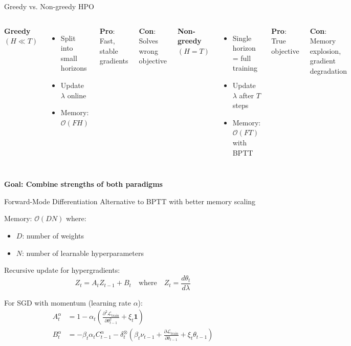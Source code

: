 \documentclass{beamer}
\begin{document}
\begin{frame}{Greedy vs. Non-greedy HPO}
\begin{columns}
\textbf{Greedy} \((H \ll T)\)
\begin{itemize}
    \item Split into small horizons
    \item Update \(\lambda\) online
    \item Memory: \(\mathcal{O}(FH)\)
\end{itemize}
\textbf{Pro}: Fast, stable gradients

\textbf{Con}: Solves wrong objective

\textbf{Non-greedy} \((H = T)\)
\begin{itemize}
    \item Single horizon = full training
    \item Update \(\lambda\) after \(T\) steps
    \item Memory: \(\mathcal{O}(FT)\) with BPTT
\end{itemize}
\textbf{Pro}: True objective

\textbf{Con}: Memory explosion, gradient degradation
\end{columns}

\vspace{0.3cm}
\begin{center}
\textbf{Goal: Combine strengths of both paradigms}
\end{center}
\end{frame}

\begin{frame}{Forward-Mode Differentiation}
Alternative to BPTT with better memory scaling

Memory: \(\mathcal{O}(DN)\) where:
\begin{itemize}
    \item \(D\): number of weights
    \item \(N\): number of learnable hyperparameters
\end{itemize}

\vspace{0.2cm}
Recursive update for hypergradients:
\begin{equation*}
Z_t = A_t Z_{t-1} + B_t \quad \text{where} \quad Z_t = \frac{d\theta_t}{d\lambda}
\end{equation*}

\vspace{0.2cm}
For SGD with momentum (learning rate \(\alpha\)):
\begin{align*}
A_t^\alpha &= 1 - \alpha_t\left(\frac{\partial^2\mathcal{L}_{\text{train}}}{\partial\theta_{t-1}^2} + \xi_t\mathbf{1}\right) \\
B_t^\alpha &= -\beta_t\alpha_t C_{t-1}^\alpha - \delta_t^\otimes\left(\beta_t\nu_{t-1} + \frac{\partial\mathcal{L}_{\text{train}}}{\partial\theta_{t-1}} + \xi_t\theta_{t-1}\right)
\end{align*}
\end{frame}
\end{document}
